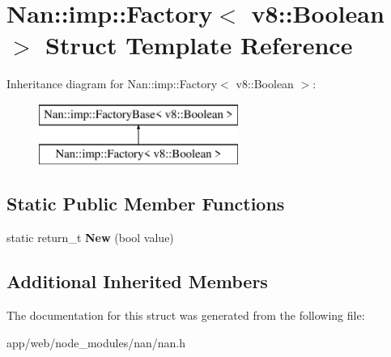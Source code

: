 \hypertarget{struct_nan_1_1imp_1_1_factory_3_01v8_1_1_boolean_01_4}{}\section{Nan\+:\+:imp\+:\+:Factory$<$ v8\+:\+:Boolean $>$ Struct Template Reference}
\label{struct_nan_1_1imp_1_1_factory_3_01v8_1_1_boolean_01_4}
Inheritance diagram for Nan\+:\+:imp\+:\+:Factory$<$ v8\+:\+:Boolean $>$\+:\begin{figure}[H]
\begin{center}
\leavevmode
\includegraphics[height=2.000000cm]{struct_nan_1_1imp_1_1_factory_3_01v8_1_1_boolean_01_4}
\end{center}
\end{figure}
\subsection*{Static Public Member Functions}
\begin{DoxyCompactItemize}
\item 
\mbox{\label{struct_nan_1_1imp_1_1_factory_3_01v8_1_1_boolean_01_4_a441125ea77c09ad41cd1d7614e6e7ddf}} 
static return\+\_\+t {\bfseries New} (bool value)
\end{DoxyCompactItemize}
\subsection*{Additional Inherited Members}


The documentation for this struct was generated from the following file\+:\begin{DoxyCompactItemize}
\item 
app/web/node\+\_\+modules/nan/nan.\+h\end{DoxyCompactItemize}
